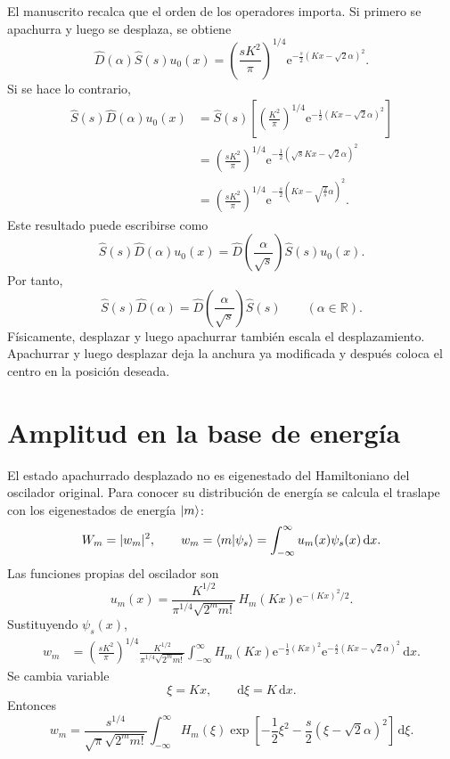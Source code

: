 \documentclass[11pt]{article}
\newcommand{\ee}{\mathrm{e}}
\newcommand{\dd}{\mathrm{d}}
\begin{document}
El manuscrito recalca que el orden de los operadores importa. Si primero se
apachurra y luego se desplaza, se obtiene
\begin{equation}
  \hat D(\alpha)\hat S(s)u_0(x)
  =
  \left(\frac{sK^2}{\pi}\right)^{1/4}
  \ee^{-\frac{s}{2}(Kx-\sqrt2\alpha)^2}.
\end{equation}
Si se hace lo contrario,
\begin{align}
  \hat S(s)\hat D(\alpha)u_0(x)
  &=
  \hat S(s)
  \left[
  \left(\frac{K^2}{\pi}\right)^{1/4}
  \ee^{-\frac12(Kx-\sqrt2\alpha)^2}
  \right]\\
  &=
  \left(\frac{sK^2}{\pi}\right)^{1/4}
  \ee^{-\frac12(\sqrt{s}Kx-\sqrt2\alpha)^2}\\
  &=
  \left(\frac{sK^2}{\pi}\right)^{1/4}
  \ee^{-\frac{s}{2}\left(Kx-\sqrt{\frac{2}{s}}\alpha\right)^2}.
\end{align}
Este resultado puede escribirse como
\begin{equation}
  \hat S(s)\hat D(\alpha)u_0(x)
  =
  \hat D\left(\frac{\alpha}{\sqrt{s}}\right)\hat S(s)u_0(x).
\end{equation}
Por tanto,
\begin{equation}
  \boxed{
  \hat S(s)\hat D(\alpha)
  =
  \hat D\left(\frac{\alpha}{\sqrt{s}}\right)\hat S(s)
  \qquad(\alpha\in\mathbb R).
  }
\end{equation}
F\'isicamente, desplazar y luego apachurrar tambi\'en escala el
desplazamiento. Apachurrar y luego desplazar deja la anchura ya modificada y
despu\'es coloca el centro en la posici\'on deseada.

\section{Amplitud en la base de energ\'ia}

El estado apachurrado desplazado no es eigenestado del Hamiltoniano del
oscilador original. Para conocer su distribuci\'on de energ\'ia se calcula el
traslape con los eigenestados de energ\'ia $\ket m$:
\begin{equation}
  W_m=|w_m|^2,
  \qquad
  w_m=\braket{m|\psi_s}
  =
  \int_{-\infty}^{\infty}u_m(x)\psi_s(x)\,\dd x.
\end{equation}
Las funciones propias del oscilador son
\begin{equation}
  u_m(x)
  =
  \frac{K^{1/2}}{\pi^{1/4}\sqrt{2^m m!}}\,
  H_m(Kx)\ee^{-(Kx)^2/2}.
\end{equation}
Sustituyendo $\psi_s(x)$,
\begin{align}
  w_m
  &=
  \left(\frac{sK^2}{\pi}\right)^{1/4}
  \frac{K^{1/2}}{\pi^{1/4}\sqrt{2^m m!}}
  \int_{-\infty}^{\infty}
  H_m(Kx)
  \ee^{-\frac12(Kx)^2}
  \ee^{-\frac{s}{2}(Kx-\sqrt2\alpha)^2}
  \,\dd x.
\end{align}
Se cambia variable
\begin{equation}
  \xi=Kx,
  \qquad
  \dd \xi=K\,\dd x.
\end{equation}
Entonces
\begin{equation}
  w_m
  =
  \frac{s^{1/4}}{\sqrt{\pi}\sqrt{2^m m!}}
  \int_{-\infty}^{\infty}
  H_m(\xi)
  \exp\left[
  -\frac12\xi^2-\frac{s}{2}(\xi-\sqrt2\alpha)^2
  \right]
  \,\dd \xi.
\end{equation}
\end{document}
